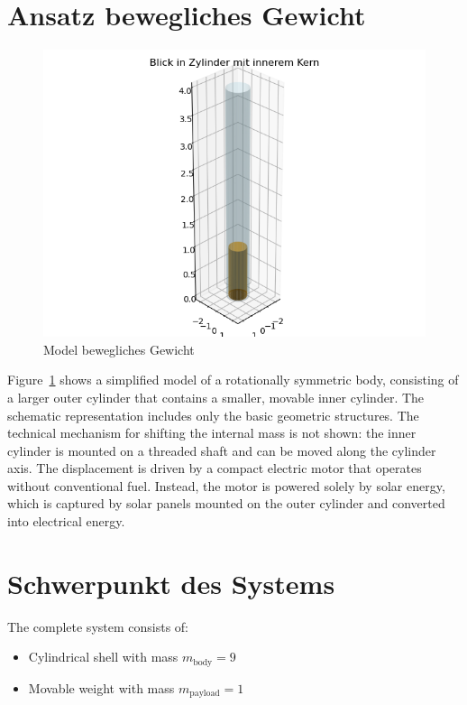\documentclass[conference]{IEEEtran}
\begin{document}
\section{Ansatz bewegliches Gewicht}

\begin{figure}
    \centering
    \includegraphics[width=\linewidth]{pics/sat_model_abstract/plot.png}
    \caption{Model bewegliches Gewicht}
    \label{fig:abstract_model}
\end{figure}


Figure~\ref{fig:abstract_model} shows a simplified model of a rotationally symmetric body, consisting of a larger outer cylinder that contains a smaller, movable inner cylinder. The schematic representation includes only the basic geometric structures. The technical mechanism for shifting the internal mass is not shown: the inner cylinder is mounted on a threaded shaft and can be moved along the cylinder axis. The displacement is driven by a compact electric motor that operates without conventional fuel. Instead, the motor is powered solely by solar energy, which is captured by solar panels mounted on the outer cylinder and converted into electrical energy.


\section{Schwerpunkt des Systems}
The complete system consists of:
\begin{itemize}
  \item Cylindrical shell with mass \( m_\text{body} = 9 \)
  \item Movable weight with mass \( m_\text{payload} = 1 \)
\end{itemize}
\end{document}
